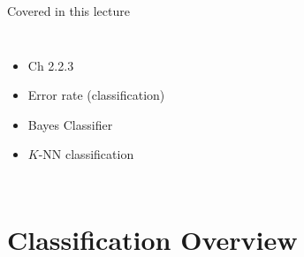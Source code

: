 \documentclass[aspectratio=169,usenames,dvipsnames]{beamer}
\begin{document}
\begin{frame}[c]{Covered in this lecture }

\begin{columns}
\centering
\begin{itemize}
	\item Ch 2.2.3 
	\item Error rate (classification)
	\item Bayes Classifier
	\item $K$-NN classification
\end{itemize}
\centering

\end{columns}

\end{frame}
\section{Classification Overview}
\end{document}
